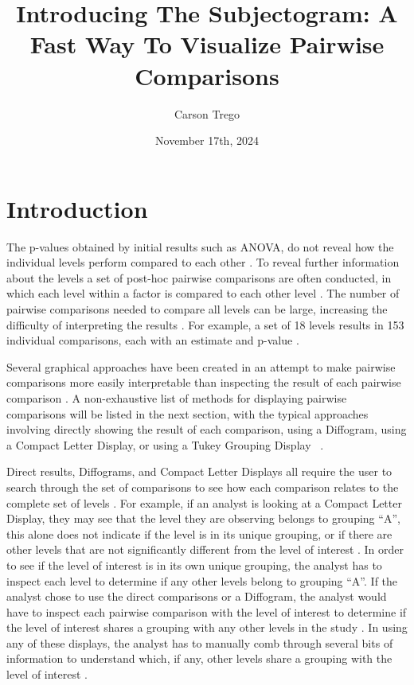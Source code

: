 \documentclass{article}
\title{Introducing The Subjectogram: A Fast Way To Visualize Pairwise Comparisons}
\author{Carson Trego}
\date{November 17th, 2024}
\begin{document}
\maketitle


\section{Introduction}


The p-values obtained by initial results such as ANOVA, do not reveal how the individual levels perform compared to each other \cite{doeBook, aovLibre}. To reveal further information about the levels a set of post-hoc pairwise comparisons are often conducted, in which each level within a factor is compared to each other level \cite{doeBook, aovLibre}. The number of pairwise comparisons needed to compare all levels can be large, increasing the difficulty of interpreting the results \cite{CLDVsLines, dontUseBars, CLDInvest, aovLibre}. For example, a set of 18 levels results in 153 individual comparisons, each with an estimate and p-value \cite{CLDVsLines}. 

Several graphical approaches have been created in an attempt to make pairwise comparisons more easily interpretable than inspecting the result of each pairwise comparison \cite{CLDVsLines, dontUseBars, CLDInvest, aovLibre}. A non-exhaustive list of methods for displaying pairwise comparisons will be listed in the next section, with the typical approaches involving directly showing the result of each comparison, using a Diffogram, using a Compact Letter Display, or using a Tukey Grouping Display  \cite{CLDVsLines, dontUseBars, CLDInvest, aovLibre, diffogramAndOtra}. 

Direct results, Diffograms, and Compact Letter Displays all require the user to search through the set of comparisons to see how each comparison relates to the complete set of levels \cite{CLDVsLines, dontUseBars, CLDInvest, aovLibre, diffogramAndOtra}. For example, if an analyst is looking at a Compact Letter Display, they may see that the level they are observing belongs to grouping ``A'', this alone does not indicate if the level is in its unique grouping, or if there are other levels that are not significantly different from the level of interest \cite{CLDVsLines, dontUseBars, CLDInvest}. In order to see if the level of interest is in its own unique grouping, the analyst has to inspect each level to determine if any other levels belong to grouping ``A''. If the analyst chose to use the direct comparisons or a Diffogram, the analyst would have to inspect each pairwise comparison with the level of interest to determine if the level of interest shares a grouping with any other levels in the study \cite{CLDVsLines, dontUseBars, CLDInvest}. In using any of these displays, the analyst has to manually comb through several bits of information to understand which, if any, other levels share a grouping with the level of interest \cite{CLDVsLines, dontUseBars, CLDInvest, aovLibre, diffogramAndOtra, procPLM}. 
\end{document}
